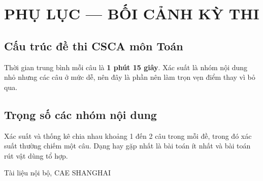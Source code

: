 \documentclass[11pt, a4paper]{article}
\begin{document}
\section{PHỤ LỤC — BỐI CẢNH KỲ THI}

\subsection{Cấu trúc đề thi CSCA môn Toán}


Thời gian trung bình mỗi câu là \textbf{1 phút 15 giây}. Xác suất là nhóm nội dung nhỏ nhưng các câu ở mức dễ, nên đây là phần nên làm trọn vẹn điểm thay vì bỏ qua.

\subsection{Trọng số các nhóm nội dung}


Xác suất và thống kê chia nhau khoảng 1 đến 2 câu trong mỗi đề, trong đó xác suất thường chiếm một câu. Dạng hay gặp nhất là bài toán ít nhất và bài toán rút vật dùng tổ hợp.
\vspace{0.8cm}
\begin{center}
{\footnotesize\color{cae_blue} Tài liệu nội bộ, CAE SHANGHAI}
\end{center}
\end{document}
